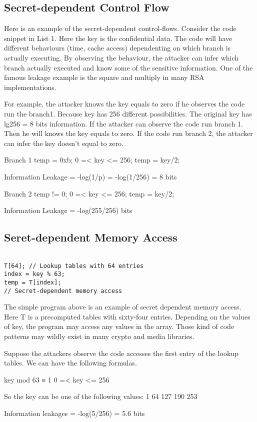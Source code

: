 \subsection{Secret-dependent Control Flow}
Here is an example of the secret-dependent control-flows. Consider the code snippet in List 1. Here the key is the confidential data. The code will have different behaviours (time, cache access) dependenting on which branch is actually executing. By observing the behaviour, the attacker can infer which branch actually executed and know some of the sensitive information. One of the famous leakage example is the square and multiply in many RSA implementations. 

For example, the attacker knows the key equals to zero if he observes the code run the branch1. Because key has 256 different possibilities. The original key has lg256 = 8 bits information. If the attacker can observe the code run branch 1. Then he will knows the key equals to zero. If the code run branch 2, the attacker can infer the key doesn’t equal to zero. 

Branch 1
temp = 0xb;
0 =< key <= 256;
temp = key/2;

Information Leakage = -log(1/p) = -log(1/256) = 8 bits

Branch 2
temp != 0; 
0 =< key <= 256;
temp = key/2;

Information Leakage = -log(255/256) bits

\subsection{Seret-dependent Memory Access}

\begin{lstlisting}

T[64]; // Lookup tables with 64 entries
index = key % 63;
temp = T[index]; 
// Secret-dependent memory access       

\end{lstlisting}

The simple program above is an example of secret dependent memory access. Here T is a precomputed tables with sixty-four entries. Depending on the values of key, the program may access any values in the array. Those kind of code patterns may wildly exist in many crypto and media libraries. 

Suppose the attackers observe the code accesses the first entry of the lookup tables. We can have the following formulas.

key mod 63 ≡ 1
0 =< key <= 256

So the key can be one of the following values:
1 64 127 190 253

Information leakages = -log(5/256) =  5.6 bits

